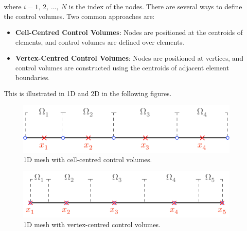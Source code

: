 \documentclass{article}
\begin{document}
where \(i = 1,\: 2,\: \ldots,\: N\) is the index of the nodes.
There are several ways to define the control volumes. Two common
approaches are:
\begin{itemize}
    \item \textbf{Cell-Centred Control Volumes}: Nodes are positioned
          at the centroids of elements, and control volumes are defined over
          elements.
    \item \textbf{Vertex-Centred Control Volumes}: Nodes are positioned
          at vertices, and control volumes are constructed using the centroids
          of adjacent element boundaries.
\end{itemize}
This is illustrated in 1D and 2D in the following figures.
\begin{figure}[H]
    \centering
    \includegraphics[width = 0.8\linewidth]{figures/1d-cell-centered.pdf}
    \caption{1D mesh with cell-centred control volumes.} %
\end{figure}
\begin{figure}[H]
    \centering
    \includegraphics[width = 0.8\linewidth]{figures/1d-vertex-centered.pdf}
    \caption{1D mesh with vertex-centred control volumes.} %
\end{figure}
\end{document}
